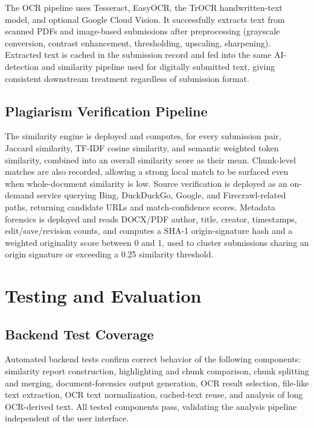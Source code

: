 \documentclass[12pt, a4paper]{report}
\numberwithin{equation}{chapter}
\begin{document}
The OCR pipeline uses Tesseract, EasyOCR, the TrOCR handwritten-text model, and optional Google Cloud Vision. It successfully extracts text from scanned PDFs and image-based submissions after preprocessing (grayscale conversion, contrast enhancement, thresholding, upscaling, sharpening). Extracted text is cached in the submission record and fed into the same AI-detection and similarity pipeline used for digitally submitted text, giving consistent downstream treatment regardless of submission format.

\subsection{Plagiarism Verification Pipeline}

The similarity engine is deployed and computes, for every submission pair, Jaccard similarity, TF-IDF cosine similarity, and semantic weighted token similarity, combined into an overall similarity score as their mean. Chunk-level matches are also recorded, allowing a strong local match to be surfaced even when whole-document similarity is low. Source verification is deployed as an on-demand service querying Bing, DuckDuckGo, Google, and Firecrawl-related paths, returning candidate URLs and match-confidence scores. Metadata forensics is deployed and reads DOCX/PDF author, title, creator, timestamps, edit/save/revision counts, and computes a SHA-1 origin-signature hash and a weighted originality score between 0 and 1, used to cluster submissions sharing an origin signature or exceeding a 0.25 similarity threshold.

\section{Testing and Evaluation}

\subsection{Backend Test Coverage}

Automated backend tests confirm correct behavior of the following components: similarity report construction, highlighting and chunk comparison, chunk splitting and merging, document-forensics output generation, OCR result selection, file-like text extraction, OCR text normalization, cached-text reuse, and analysis of long OCR-derived text. All tested components pass, validating the analysis pipeline independent of the user interface.
\end{document}
